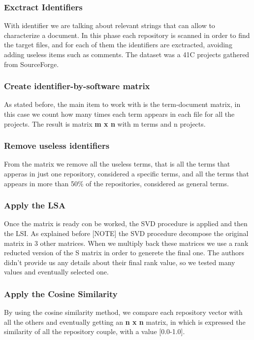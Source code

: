 \subsubsection{Exctract Identifiers}
With identifier we are talking about relevant strings that can allow to characterize a document. In this phase each repository is scanned in order to find the target files, and for each of them the identifiers are exctracted, avoiding adding useless items such as comments. The dataset was a 41C projects gathered from SourceForge.

\subsubsection{Create identifier-by-software matrix}
As stated before, the main item to work with is the term-document matrix, in this case we count how many times each term appears in each file for all the projects. The result is matrix \textbf{m x n} with m terms and n projects.

\subsubsection{Remove useless identifiers}
From the matrix we remove all the useless terms, that is all the terms that apperas in just one repository, considered a specific terms, and all the terms that appears in more than 50\% of the repositories, considered as general terms.

\subsubsection{Apply the LSA}
Once the matrix is ready con be worked, the SVD procedure is applied and then the LSI. As explained before [NOTE] the SVD procedure decompose the original matrix in 3 other matrices. When we multiply back these matrices we use a rank reducted version of the S matrix in order to generete the final one. The authors didn't provide us any details about their final rank value, so we tested many values and eventually selected one.

\subsubsection{Apply the Cosine Similarity}
By using the cosine similarity method, we compare each repository vector with all the others and eventually getting an \textbf{n x n} matrix, in which is expressed the similarity of all the repository couple, with a value [0.0-1.0].

